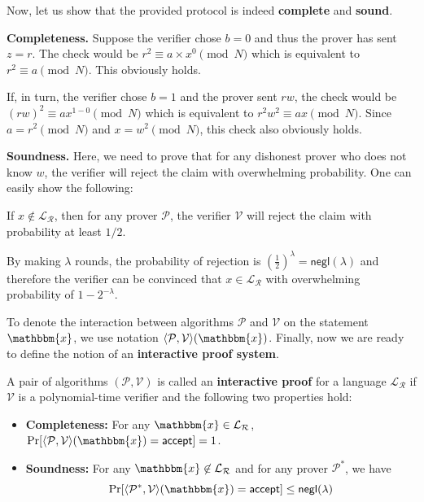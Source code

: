\documentclass[../lecture-notes-148x210.tex]{subfiles}
\begin{document}
Now, let us show that the provided protocol is indeed \textbf{complete} and \textbf{sound}.

\textbf{Completeness.} Suppose the verifier chose $b=0$ and thus the prover has sent $z=r$. The check would be $r^2 \equiv a\times x^{0} \pmod{N}$ which is equivalent to $r^2 \equiv a \pmod{N}$. This obviously holds. 

If, in turn, the verifier chose $b=1$ and the prover sent $rw$, the check would be $(rw)^2 \equiv ax^{1-0} \pmod{N}$ which is equivalent to $r^2w^2 \equiv ax \pmod{N}$. Since $a = r^2 \pmod{N}$ and $x = w^2 \pmod{N}$, this check also obviously holds.

\textbf{Soundness.} Here, we need to prove that for any dishonest prover who
does not know $w$, the verifier will reject the claim with overwhelming
probability. One can easily show the following:

\begin{proposition}
    If $x \not\in \mathcal{L}_{\mathcal{R}}$, then for any prover $\mathcal{P}$, the verifier $\mathcal{V}$ will reject the claim with probability at least $1/2$.
\end{proposition}

By making $\lambda$ rounds, the probability of rejection is $\left(\frac{1}{2}\right)^{\lambda} = \mathsf{negl}(\lambda)$ and therefore the verifier can be convinced that $x \in \mathcal{L}_{\mathcal{R}}$ with overwhelming probability of $1-2^{-\lambda}$.

To denote the interaction between algorithms $\mathcal{P}$ and $\mathcal{V}$ on
the statement $\mathbbm{x}$, we use notation $\langle \mathcal{P}, \mathcal{V}
\rangle(\mathbbm{x})$. Finally, now we are ready to define the notion of an
\textbf{interactive proof system}.

\begin{definition}
    A pair of algorithms $(\mathcal{P},\mathcal{V})$ is called an
    \textbf{interactive proof} for a language $\mathcal{L}_{\mathcal{R}}$ if
    $\mathcal{V}$ is a polynomial-time verifier and the following two properties
    hold:
    \begin{itemize}
        \item \textbf{Completeness:} For any $\mathbbm{x} \in
        \mathcal{L}_{\mathcal{R}}$, $\text{Pr}[\langle \mathcal{P}, \mathcal{V}
        \rangle(\mathbbm{x}) = \mathsf{accept}]=1$.
        \item \textbf{Soundness:} For any $\mathbbm{x} \not\in
        \mathcal{L}_{\mathcal{R}}$ and for any prover $\mathcal{P}^*$, we have 
        \begin{equation*}
            \text{Pr}[\langle \mathcal{P}^*, \mathcal{V} \rangle(\mathbbm{x}) = \mathsf{accept}] \leq \mathsf{negl}(\lambda)
        \end{equation*}
    \end{itemize}
\end{definition}
\end{document}
